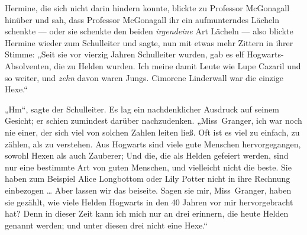 Hermine, die sich nicht darin hindern konnte, blickte zu Professor McGonagall hinüber und sah, dass Professor McGonagall ihr ein aufmunterndes Lächeln schenkte — oder sie schenkte den beiden \emph{irgendeine} Art Lächeln — also blickte Hermine wieder zum Schulleiter und sagte, nun mit etwas mehr Zittern in ihrer Stimme:
„Seit sie vor vierzig Jahren Schulleiter wurden, gab es elf Hogwarts-Absolventen, die zu Helden wurden. Ich meine damit Leute wie Lupe Cazaril und so weiter, und \emph{zehn} davon waren Jungs. Cimorene Linderwall war die einzige Hexe.“

„Hm“, sagte der Schulleiter. Es lag ein nachdenklicher Ausdruck auf seinem Gesicht; er schien zumindest darüber nachzudenken.
„Miss~Granger, ich war noch nie einer, der sich viel von solchen Zahlen leiten ließ. Oft ist es viel zu einfach, zu zählen, als zu verstehen. Aus Hogwarts sind viele gute Menschen hervorgegangen, sowohl Hexen als auch Zauberer; Und die, die als Helden gefeiert werden, sind nur eine bestimmte Art von guten Menschen, und vielleicht nicht die beste. Sie haben zum Beispiel Alice Longbottom oder Lily Potter nicht in ihre Rechnung einbezogen … Aber lassen wir das beiseite. Sagen sie mir, Miss~Granger, haben sie gezählt, wie viele Helden Hogwarts in den 40 Jahren vor mir hervorgebracht hat? Denn in dieser Zeit kann ich mich nur an drei erinnern, die heute Helden genannt werden; und unter diesen drei nicht eine Hexe.“

